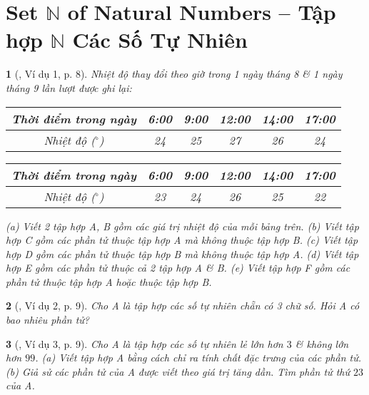\documentclass{article}
\newtheorem{baitoan}{}
\begin{document}
\section{Set $\mathbb{N}$ of Natural Numbers -- Tập hợp $\mathbb{N}$ Các Số Tự Nhiên}

\begin{baitoan}[\cite{Binh_boi_duong_Toan_6_tap_1}, Ví dụ 1, p. 8]
	Nhiệt độ thay đổi theo giờ trong 1 ngày tháng 8 \& 1 ngày tháng 9 lần lượt được ghi lại:
	\begin{table}[H]
		\centering
		\begin{tabular}{|c|c|c|c|c|c|}
			\hline
			Thời điểm trong ngày & 6:00 & 9:00 & 12:00 & 14:00 & 17:00 \\
			\hline
			Nhiệt độ (${}^\circ$) & 24 & 25 & 27 & 26 & 24 \\
			\hline
		\end{tabular}
	\end{table}
	\begin{table}[H]
		\centering
		\begin{tabular}{|c|c|c|c|c|c|}
			\hline
			Thời điểm trong ngày & 6:00 & 9:00 & 12:00 & 14:00 & 17:00 \\
			\hline
			Nhiệt độ (${}^\circ$) & 23 & 24 & 26 & 25 & 22 \\
			\hline
		\end{tabular}
	\end{table}
	\noindent(a) Viết 2 tập hợp A, B gồm các giá trị nhiệt độ của mỗi bảng trên. (b) Viết tập hợp C gồm các phần tử thuộc tập hợp A mà không thuộc tập hợp B. (c) Viết tập hợp D gồm các phần tử thuộc tập hợp B mà không thuộc tập hợp A. (d) Viết tập hợp E gồm các phần tử thuộc cả 2 tập hợp A \& B. (e) Viết tập hợp F gồm các phần tử thuộc tập hợp A hoặc thuộc tập hợp B.
\end{baitoan}

\begin{baitoan}[\cite{Binh_boi_duong_Toan_6_tap_1}, Ví dụ 2, p. 9]
	Cho A là tập hợp các số tự nhiên chẵn có 3 chữ số. Hỏi A có bao nhiêu phần tử?
\end{baitoan}

\begin{baitoan}[\cite{Binh_boi_duong_Toan_6_tap_1}, Ví dụ 3, p. 9]
	Cho A là tập hợp các số tự nhiên lẻ lớn hơn $3$ \& không lớn hơn $99$. (a) Viết tập hợp A bằng cách chỉ ra tính chất đặc trưng của các phần tử. (b) Giả sử các phần tử của A được viết theo giá trị tăng dần. Tìm phần tử thứ $23$ của A.
\end{baitoan}
\end{document}
